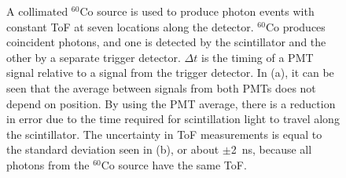 \begin{figure}[]
\centering
{}

\caption{A collimated $^{60}$Co source is used to produce photon events with constant ToF at seven locations along the detector.
$^{60}$Co produces coincident photons, and one is detected by the scintillator and the other by a separate trigger detector.
 $\Delta t$ is the timing of a PMT signal relative to a signal from the trigger detector. 
 In (a), it can be seen that the average between signals from both PMTs does not depend on position.
By using the PMT average, there is a reduction in error due to the time required for scintillation light to travel along the scintillator.
The uncertainty in ToF measurements is equal to the standard deviation seen in (b), or about $\pm$2~ns, because all photons from the $^{60}$Co source have the same ToF.}
\label{fig:ConstPMTAvg}
\end{figure}

